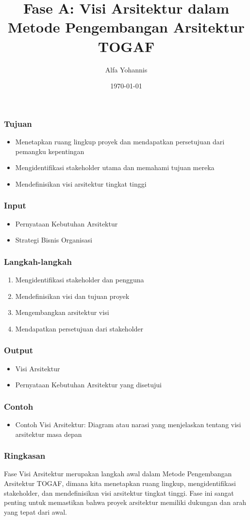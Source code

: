 \documentclass{beamer}
\title{Fase A: Visi Arsitektur dalam Metode Pengembangan Arsitektur TOGAF}
\author{Alfa Yohannis}
\date{\today}
\begin{document}
\frame{\titlepage}

\begin{frame}
\frametitle{Tujuan}
\begin{itemize}
\item Menetapkan ruang lingkup proyek dan mendapatkan persetujuan dari pemangku kepentingan
\item Mengidentifikasi stakeholder utama dan memahami tujuan mereka
\item Mendefinisikan visi arsitektur tingkat tinggi
\end{itemize}
\end{frame}

\begin{frame}
\frametitle{Input}
\begin{itemize}
\item Pernyataan Kebutuhan Arsitektur
\item Strategi Bisnis Organisasi
\end{itemize}
\end{frame}

\begin{frame}
\frametitle{Langkah-langkah}
\begin{enumerate}
\item Mengidentifikasi stakeholder dan pengguna
\item Mendefinisikan visi dan tujuan proyek
\item Mengembangkan arsitektur visi
\item Mendapatkan persetujuan dari stakeholder
\end{enumerate}
\end{frame}

\begin{frame}
\frametitle{Output}
\begin{itemize}
\item Visi Arsitektur
\item Pernyataan Kebutuhan Arsitektur yang disetujui
\end{itemize}
\end{frame}

\begin{frame}
\frametitle{Contoh}
\begin{itemize}
\item Contoh Visi Arsitektur: Diagram atau narasi yang menjelaskan tentang visi arsitektur masa depan
\end{itemize}
\end{frame}

\begin{frame}
\frametitle{Ringkasan}
Fase Visi Arsitektur merupakan langkah awal dalam Metode Pengembangan Arsitektur TOGAF, dimana kita menetapkan ruang lingkup, mengidentifikasi stakeholder, dan mendefinisikan visi arsitektur tingkat tinggi. Fase ini sangat penting untuk memastikan bahwa proyek arsitektur memiliki dukungan dan arah yang tepat dari awal.
\end{frame}
\end{document}
